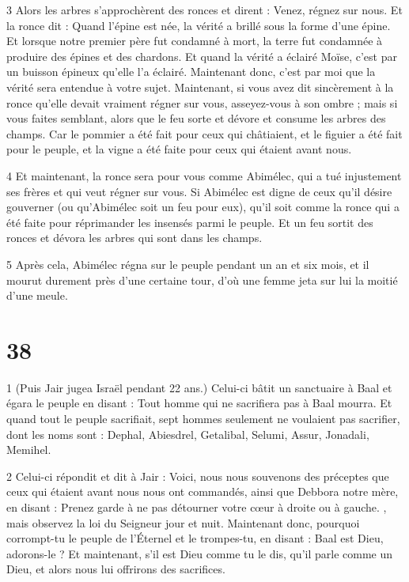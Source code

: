 \par 3 Alors les arbres s'approchèrent des ronces et dirent : Venez, régnez sur nous. Et la ronce dit : Quand l'épine est née, la vérité a brillé sous la forme d'une épine. Et lorsque notre premier père fut condamné à mort, la terre fut condamnée à produire des épines et des chardons. Et quand la vérité a éclairé Moïse, c’est par un buisson épineux qu’elle l’a éclairé. Maintenant donc, c'est par moi que la vérité sera entendue à votre sujet. Maintenant, si vous avez dit sincèrement à la ronce qu'elle devait vraiment régner sur vous, asseyez-vous à son ombre ; mais si vous faites semblant, alors que le feu sorte et dévore et consume les arbres des champs. Car le pommier a été fait pour ceux qui châtiaient, et le figuier a été fait pour le peuple, et la vigne a été faite pour ceux qui étaient avant nous.

\par 4 Et maintenant, la ronce sera pour vous comme Abimélec, qui a tué injustement ses frères et qui veut régner sur vous. Si Abimélec est digne de ceux qu'il désire gouverner (ou qu'Abimélec soit un feu pour eux), qu'il soit comme la ronce qui a été faite pour réprimander les insensés parmi le peuple. Et un feu sortit des ronces et dévora les arbres qui sont dans les champs.

\par 5 Après cela, Abimélec régna sur le peuple pendant un an et six mois, et il mourut durement près d'une certaine tour, d'où une femme jeta sur lui la moitié d'une meule.

\par [Un espace de longueur incertaine dans le texte.]

\chapter{38}

\par 1 (Puis Jair jugea Israël pendant 22 ans.) Celui-ci bâtit un sanctuaire à Baal et égara le peuple en disant : Tout homme qui ne sacrifiera pas à Baal mourra. Et quand tout le peuple sacrifiait, sept hommes seulement ne voulaient pas sacrifier, dont les noms sont : Dephal, Abiesdrel, Getalibal, Selumi, Assur, Jonadali, Memihel.

\par 2 Celui-ci répondit et dit à Jair : Voici, nous nous souvenons des préceptes que ceux qui étaient avant nous nous ont commandés, ainsi que Debbora notre mère, en disant : Prenez garde à ne pas détourner votre cœur à droite ou à gauche. , mais observez la loi du Seigneur jour et nuit. Maintenant donc, pourquoi corrompt-tu le peuple de l’Éternel et le trompes-tu, en disant : Baal est Dieu, adorons-le ? Et maintenant, s'il est Dieu comme tu le dis, qu'il parle comme un Dieu, et alors nous lui offrirons des sacrifices.

